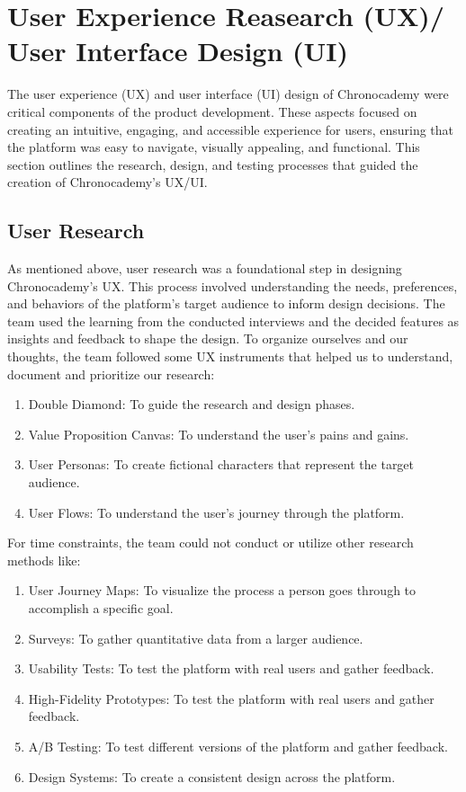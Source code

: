 \section{User Experience Reasearch (UX)/ User Interface Design (UI)}\label{sec:user-experience-reasearch-(ux)/-user-interface-design-(ui)}
The user experience (UX) and user interface (UI) design of Chronocademy were critical components of the product development.
These aspects focused on creating an intuitive, engaging, and accessible experience for users, ensuring that the platform was easy to navigate, visually appealing, and functional.
This section outlines the research, design, and testing processes that guided the creation of Chronocademy's UX/UI\@.

\subsection{User Research}\label{subsec:user-research}
As mentioned above, user research was a foundational step in designing Chronocademy's UX\@.
This process involved understanding the needs, preferences, and behaviors of the platform's target audience to inform design decisions.
The team used the learning from the conducted interviews and the decided features as insights and feedback to shape the design.
To organize ourselves and our thoughts, the team followed some UX instruments that helped us to understand, document and prioritize our research:\newline
\begin{enumerate}
    \item Double Diamond: To guide the research and design phases.
    \item Value Proposition Canvas: To understand the user's pains and gains.
    \item User Personas: To create fictional characters that represent the target audience.
    \item User Flows: To understand the user's journey through the platform.
\end{enumerate}

For time constraints, the team could not conduct or utilize other research methods like:\newline
\begin{enumerate}
    \item User Journey Maps: To visualize the process a person goes through to accomplish a specific goal.
    \item Surveys: To gather quantitative data from a larger audience.
    \item Usability Tests: To test the platform with real users and gather feedback.
    \item High-Fidelity Prototypes: To test the platform with real users and gather feedback.
    \item A/B Testing: To test different versions of the platform and gather feedback.
    \item Design Systems: To create a consistent design across the platform.
\end{enumerate}

